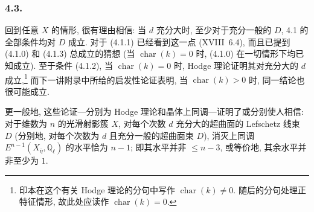 \subsubsection*{4.3.}
回到任意 $X$ 的情形, 很有理由相信: 当 $d$ 充分大时, 至少对于充分一般的 $D$, 4.1 的全部条件均对 $D$ 成立. 对于 (4.1.1) 已经看到这一点 (XVIII~6.4), 而且已提到 (4.1.0) 和 (4.1.3) 总成立的猜想 (当 $\operatorname{char}(k)=0$ 时, (4.1.0) 在一切情形下均已知成立). 至于条件 (4.1.2), 当 $\operatorname{char}(k)=0$ 时, Hodge 理论证明其对充分大的 $d$ 成立,\footnote{印本在这个有关 Hodge 理论的分句中写作 $\operatorname{char}(k)\ne0$. 随后的分句处理正特征情形, 故此处应读作 $\operatorname{char}(k)=0$.} 而下一讲附录中所给的启发性论证表明, 当 $\operatorname{char}(k)>0$ 时, 同一结论也很可能成立.

更一般地, 这些论证---分别为 Hodge 理论和晶体上同调---证明了或分别使人相信: 对于维数为 $n$ 的光滑射影簇 $X$, 对每个次数 $d$ 充分大的超曲面的 Lefschetz 线束 $D$ (分别地, 对每个次数为 $d$ 且充分一般的超曲面束 $D$), 消灭上同调 $E^{n-1}(X_{\bar\eta},\mathbb Q_\ell)$ 的水平恰为 $n-1$; 即其水平并非 $\leq n-3$, 或等价地, 其余水平并非至少为 $1$.
